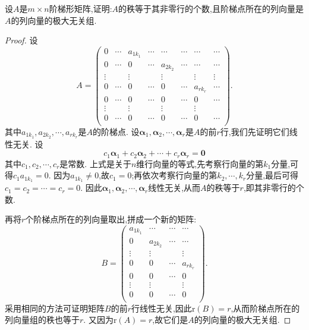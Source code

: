 \documentclass[../../main.tex]{subfiles}%
\begin{document}
\begin{proposition}\label{proposition:阶梯形矩阵的非零行对应其列向量的极大无关组}
设\(A\)是\(m\times n\)阶梯形矩阵,证明:\(A\)的秩等于其非零行的个数,且阶梯点所在的列向量是\(A\)的列向量的极大无关组.
\end{proposition}
\begin{proof}
设
\[
A=\left( \begin{matrix}
0&		\cdots&		a_{1k_1}&		\cdots&		\cdots&		\cdots&		\cdots&		\cdots\\
0&		\cdots&		0&		\cdots&		a_{2k_2}&		\cdots&		\cdots&		\cdots\\
\vdots&		&		\vdots&		&		\vdots&		&		\vdots&		\vdots\\
0&		\cdots&		0&		\cdots&		0&		\cdots&		a_{rk_r}&		\cdots\\
0&		\cdots&		0&		\cdots&		0&		\cdots&		0&		\cdots\\
\vdots&		&		\vdots&		&		\vdots&		&		\vdots&		\\
0&		\cdots&		0&		\cdots&		0&		\cdots&		0&		\cdots\\
\end{matrix} \right) .
\]
其中\(a_{1k_1},a_{2k_2},\cdots,a_{rk_r}\)是\(A\)的阶梯点. 设\(\boldsymbol{\alpha}_1,\boldsymbol{\alpha}_2,\cdots,\boldsymbol{\alpha}_r\)是\(A\)的前\(r\)行,我们先证明它们线性无关. 设
\[
c_1\boldsymbol{\alpha}_1 + c_2\boldsymbol{\alpha}_2+\cdots + c_r\boldsymbol{\alpha}_r=\boldsymbol{0}
\]
其中\(c_1,c_2,\cdots,c_r\)是常数. 上式是关于\(n\)维行向量的等式,先考察行向量的第\(k_1\)分量,可得\(c_1a_{1k_1}=0\). 因为\(a_{1k_1}\neq0\),故\(c_1 = 0\);再依次考察行向量的第\(k_2,\cdots,k_r\)分量,最后可得\(c_1 = c_2=\cdots = c_r = 0\). 因此\(\boldsymbol{\alpha}_1,\boldsymbol{\alpha}_2,\cdots,\boldsymbol{\alpha}_r\)线性无关,从而\(A\)的秩等于\(r\),即其非零行的个数.

再将\(r\)个阶梯点所在的列向量取出,拼成一个新的矩阵:
\[
B=\left( \begin{matrix}
a_{1k_1}&		\cdots&		\cdots&		\cdots\\
0&		a_{2k_2}&		\cdots&		\cdots\\
\vdots&		\vdots&		&		\vdots\\
0&		0&		\cdots&		a_{rk_r}\\
0&		0&		\cdots&		0\\
\vdots&		\vdots&		&		\vdots\\
0&		0&		\cdots&		0\\
\end{matrix} \right) .
\]
采用相同的方法可证明矩阵\(B\)的前\(r\)行线性无关,因此\(\text{r}(B)=r\),从而阶梯点所在的列向量组的秩也等于\(r\). 又因为\(\text{r}(A)=r\),故它们是\(A\)的列向量的极大无关组.
\end{proof}
\end{document}
